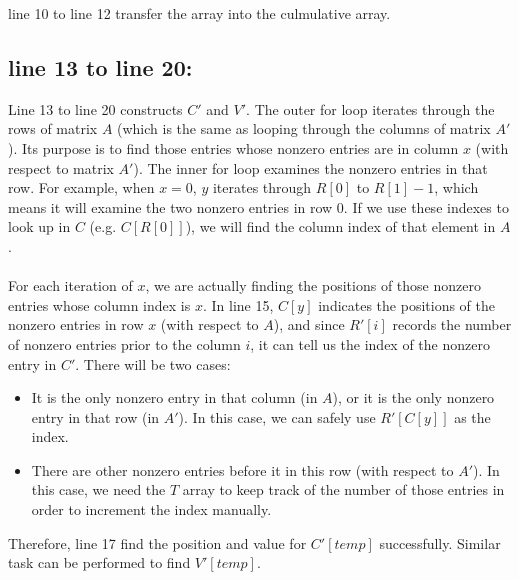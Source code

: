 \documentclass{article}
\begin{document}
\noindent line 10 to line 12 transfer the array into the culmulative array. 

\subsection*{line 13 to line 20: }
Line 13 to line 20 constructs $C'$ and $V'$. 
The outer for loop iterates through the rows of matrix $A$ (which is the same as looping through the columns of matrix $A'$). Its purpose is to find those entries whose nonzero entries are in column $x$ (with respect
to matrix $A'$). The inner for loop examines the nonzero entries in that row. For example, when $x = 0$, $y$ iterates through $R[0]$ 
to $R[1]-1$, which means it will examine the two nonzero entries in row $0$. If we use these indexes to look up in $C$ (e.g. $C[R[0]]$), we will find the column index of that element in $A$. \\ \\

\noindent For each iteration of $x$, we are actually finding the positions of those nonzero entries whose column index is $x$. In line 15, $C[y]$ indicates the positions of the nonzero entries in row $x$ (with respect to $A$), 
and since $R'[i]$ records the number of nonzero entries prior to the column $i$, it can tell us the index of the nonzero entry in $C'$. There will be two cases: 
\begin{itemize}
    \item It is the only nonzero entry in that column (in $A$), or it is the only nonzero entry in that row (in $A'$). In this case, we can safely use $R'[C[y]]$ as the index.
    \item There are other nonzero entries before it in this row (with respect to $A'$). In this case, we need the $T$ array to keep track of the number of those entries in order to increment the index manually.
\end{itemize}
Therefore, line 17 find the position and value for $C'[temp]$ successfully. Similar task can be performed to find $V'[temp]$.
\end{document}
